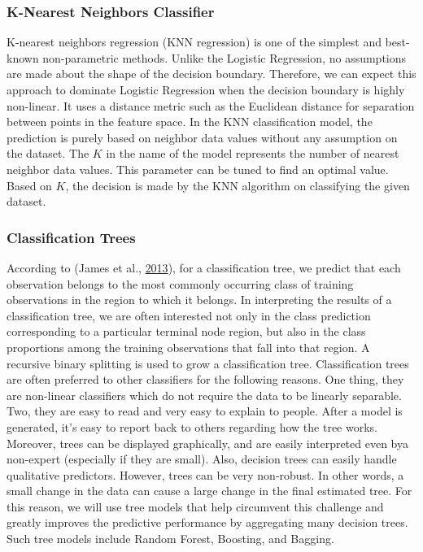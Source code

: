 \documentclass[
  10pt,
]{article}
\begin{document}
\hypertarget{k-nearest-neighbors-classifier}{%
\subsubsection{K-Nearest Neighbors Classifier}\label{k-nearest-neighbors-classifier}}

K-nearest neighbors regression (KNN regression) is one of the simplest and best-known
non-parametric methods. Unlike the Logistic Regression, no assumptions are made about the shape of the decision boundary. Therefore, we can expect this approach to dominate Logistic Regression when the decision boundary is highly non-linear. It uses a distance metric such as the Euclidean distance for separation between points in the feature space. In the KNN classification model, the prediction is purely based on neighbor data values without any assumption on the dataset. The \(K\) in the name of the model represents the number of nearest neighbor data values. This parameter can be tuned to find an optimal value. Based on \(K\), the decision is made by the KNN algorithm on classifying the given dataset.

\hypertarget{classification-trees}{%
\subsubsection{Classification Trees}\label{classification-trees}}

According to (James et al., \protect\hyperlink{ref-james2013introduction}{2013}), for a classification tree, we predict that each observation belongs to the most commonly occurring class of training observations in the region to which it belongs. In interpreting the results of a classification tree, we are often interested not only in the class prediction corresponding to a particular terminal node region, but also in the class proportions among the training observations that fall into that region. A recursive binary splitting is used to grow a classification tree. Classification trees are often preferred to other classifiers for the following reasons. One thing, they are non-linear classifiers which do not require the data to be linearly separable. Two, they are easy to read and very easy to explain to people. After a model is generated, it's easy to report back to others regarding how the tree works. Moreover, trees can be displayed graphically, and are easily interpreted even bya non-expert (especially if they are small). Also, decision trees can easily handle qualitative predictors. However, trees can be very non-robust. In other words, a small change in the data can cause a large change in the final estimated tree. For this reason, we will use tree models that help circumvent this challenge and greatly improves the predictive performance by aggregating many decision trees. Such tree models include Random Forest, Boosting, and Bagging.
\end{document}
